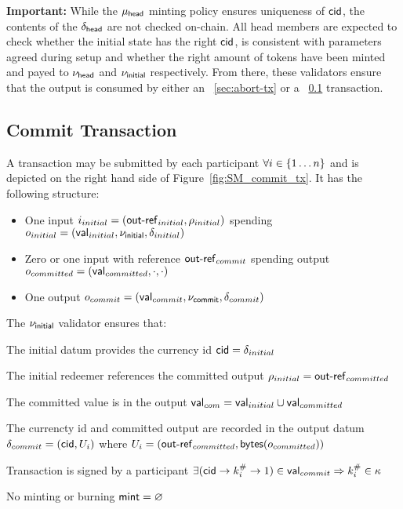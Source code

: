 \noindent \textbf{Important:} While the $\mu_\mathsf{head}$ minting policy ensures
uniqueness of $\mathsf{cid}$, the contents of the $\delta_{\mathsf{head}}$ are not
checked on-chain. All head members are expected to check whether the initial
state has the right $\mathsf{cid}$, is consistent with parameters agreed during setup
and whether the right amount of tokens have been minted and payed to $\nu_\mathsf{head}$
and $\nu_\mathsf{initial}$ respectively. From there, these validators ensure that the
output is consumed by either an \mtxAbort{}~\ref{sec:abort-tx} or a
\mtxCom{}~\ref{sec:commit-tx} transaction.



\subsection{Commit Transaction}\label{sec:commit-tx}

A \mtxCom{} transaction may be submitted by each participant
$\forall i \in \{1 \dots n\}$ and is depicted on the right hand side of
Figure~\ref{fig:SM_commit_tx}. It has the following structure:
\begin{itemize}
  \item One input $i_{initial} = (\mathsf{out\textsf{-}{}ref}_{initial}, \rho_{initial})$
        spending $o_{initial} = (\mathsf{val}_{initial}, \nu_\mathsf{initial}, \delta_{initial})$
  \item Zero or one input with reference $\mathsf{out\textsf{-}{}ref}_{commit}$ spending output
        $o_{committed} = (\mathsf{val}_{committed}, \cdot , \cdot)$ 
  \item One output $o_{commit} = (\mathsf{val}_{commit}, \nu_\mathsf{commit}, \delta_{commit})$
\end{itemize}

\noindent The $\nu_\mathsf{initial}$ validator ensures that:
\begin{menumerate}
  \item The initial datum provides the currency id $\mathsf{cid} = \delta_{initial}$
  \item The initial redeemer references the committed output $\rho_{initial} = \mathsf{out\textsf{-}{}ref}_{committed}$
  \item The committed value is in the output $\mathsf{val}_{com} = \mathsf{val}_{initial} \cup \mathsf{val}_{committed}$
  \item The currencty id and committed output are recorded in the output datum
  $\delta_{commit} = (\mathsf{cid}, U_{i})$ where
  $U_{i} = (\mathsf{out\textsf{-}{}ref}_{committed},\mathsf{bytes}(o_{committed}))$
  \item Transaction is signed by a participant $\exists (\mathsf{cid} \rightarrow k^{\#}_{i} \rightarrow 1) \in \mathsf{val}_{commit} \Rightarrow k^{\#}_{i} \in \kappa$
  \item No minting or burning  $\mathsf{mint} = \varnothing$
\end{menumerate}

